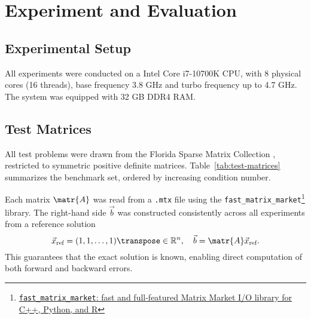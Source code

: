 \chapter{Experiment and Evaluation}
\label{cha:exper-eval}

\section{Experimental Setup}
\label{sec:experimental-setup}

All experiments were conducted on a Intel\textsuperscript{\textregistered}
Core\textsuperscript{\texttrademark} i7-10700K CPU, with 8 physical cores (16
threads), base frequency 3.8 GHz and turbo frequency up to 4.7 GHz. The system
was equipped with 32 GB DDR4 RAM.

\section{Test Matrices}
\label{sec:test-matrices}

All test problems were drawn from the Florida Sparse Matrix Collection
\cite{davis_university_2011}, restricted to symmetric positive definite
matrices. Table~\ref{tab:test-matrices} summarizes the benchmark set, ordered by
increasing condition number.

Each matrix \(\matr{A}\) was read from a \texttt{.mtx} file using the
\texttt{fast\_matrix\_market}\footnote{\href{https://github.com/alugowski/fast_matrix_market}{\texttt{fast\_matrix\_market}:
    fast and full-featured Matrix Market I/O library for C++, Python, and R}}
library. The right-hand side \(\vec{b}\) was constructed consistently across all
experiments from a reference solution \[\vec{x}_{\text{ref}} = (1, 1, \dots,
  1)\transpose \in \mathbb{R}^{n}, \quad \vec{b} =
  \matr{A}\vec{x}_{\text{ref}}.\] This guarantees that the exact solution is
known, enabling direct computation of both forward and backward errors.

